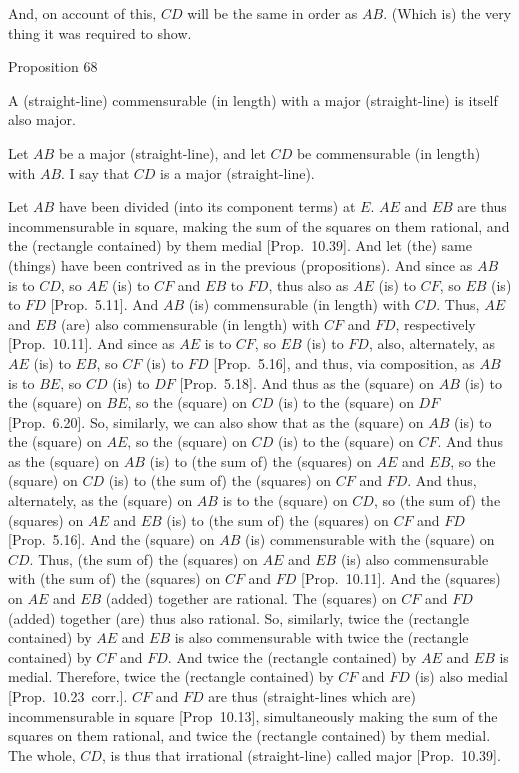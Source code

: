 And, on account of this, $CD$ will be  the same in order as $AB$.
(Which is) the very thing it was required to show.


\begin{center}
{\large Proposition 68}
\end{center}

A (straight-line) commensurable (in length)
with a major (straight-line) is  itself also major.

\epsfysize=0.7in 
\centerline{}

Let $AB$ be a major (straight-line), and let $CD$ be commensurable (in
length) with $AB$. I say that $CD$ is a major (straight-line).

Let $AB$ have been divided (into its component terms) at $E$.
$AE$ and $EB$ are thus incommensurable in square, making the sum
of the squares on them rational, and the (rectangle contained) by them
medial [Prop.~10.39]. And let (the) same (things) have been contrived as in the previous (propositions). And since
as $AB$ is to $CD$, so $AE$ (is) to $CF$ and $EB$ to $FD$, 
thus also as $AE$ (is) to $CF$, so $EB$ (is) to $FD$ [Prop.~5.11]. And $AB$ (is) commensurable
(in length) with $CD$. Thus, $AE$ and $EB$ (are) also commensurable
(in length) with $CF$ and $FD$, respectively [Prop.~10.11].  And since as $AE$ is to $CF$, so
$EB$ (is) to $FD$, also, alternately, as $AE$ (is) to $EB$, so
$CF$ (is) to $FD$ [Prop.~5.16], and thus, via composition, as $AB$ is to $BE$, so $CD$ (is) to $DF$ [Prop.~5.18]. And thus as the (square) on $AB$
(is) to the (square) on $BE$, so the (square) on $CD$ (is) to the (square)
on $DF$ [Prop.~6.20]. So, similarly, we can also show that as the (square) on $AB$ (is) to the (square) on $AE$, so the
(square) on $CD$ (is) to the (square) on $CF$. And thus as the (square)
on $AB$ (is) to (the sum of) the (squares) on $AE$ and $EB$, so
the (square) on $CD$ (is) to (the sum of) the (squares) on $CF$ and $FD$.
And thus, alternately, as the (square) on $AB$ is to the (square) on $CD$,
so (the sum of) the (squares) on $AE$ and $EB$ (is) to (the sum of)
the (squares) on $CF$ and $FD$ [Prop.~5.16]. And the (square) on $AB$
(is) commensurable with the (square) on $CD$. Thus, (the sum of) the
(squares) on $AE$ and $EB$ (is) also commensurable with (the sum of)
the (squares) on $CF$ and $FD$ [Prop.~10.11]. 
And the (squares) on $AE$ and $EB$ (added) together are rational.
The (squares) on $CF$ and $FD$ (added) together (are) thus also
rational. So, similarly, twice the (rectangle contained) by $AE$ and
$EB$ is also commensurable with twice the (rectangle contained)
by $CF$ and $FD$. And twice the (rectangle contained) by $AE$ and $EB$
is medial. Therefore, twice the (rectangle contained) by $CF$ and
$FD$ (is) also medial [Prop.~10.23~corr.]. 
$CF$ and $FD$ are thus (straight-lines which are) incommensurable in square [Prop~10.13], simultaneously making the sum of the
squares on them rational, and twice the (rectangle contained) by them medial.
The whole, $CD$, is thus that irrational (straight-line) called major
[Prop.~10.39].

